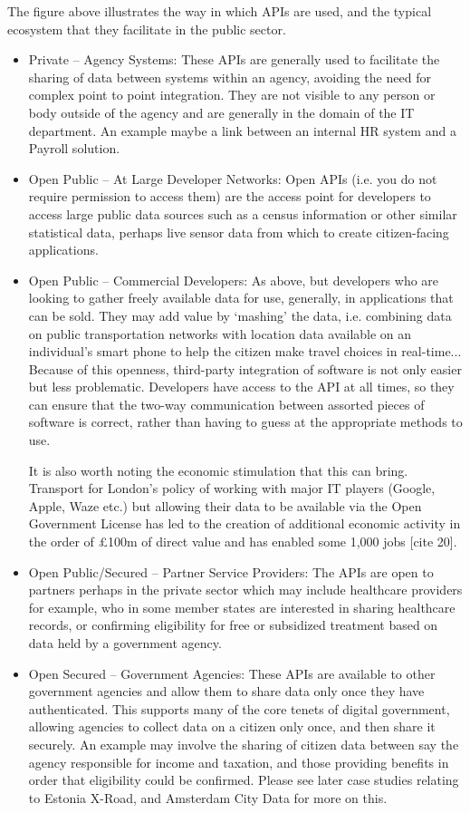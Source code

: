 The figure above illustrates the way in which APIs are used, and the typical
ecosystem that they facilitate in the public sector.
\begin{itemize}
	\item Private – Agency Systems: These APIs are generally used to facilitate
	 the sharing of data between systems within an agency, avoiding the need
	 for complex point to point integration. They are not visible to any person
	 or body outside of the agency and are generally in the domain of the IT
	 department. An example maybe a link between an internal HR system and a
	 Payroll solution.
	 \item Open Public – At Large Developer Networks: Open APIs (i.e. you do
	 not require permission to access them) are the access point for developers
	 to access large public data sources such as a census information or other
	 similar statistical data, perhaps live sensor data from which to create
	 citizen-facing applications.
	 \item Open Public – Commercial Developers: As above, but developers who are
	 looking to gather freely available data for use, generally, in applications
	 that can be sold. They may add value by ‘mashing’ the data, i.e. combining
	 data on public transportation networks with location data available on an
	 individual’s smart phone to help the citizen make travel choices in real-time...
	 Because of this openness, third-party integration of software is not only easier
	 but less problematic. Developers have access to the API at all times, so they
	 can ensure that the two-way communication between assorted pieces of software
	 is correct, rather than having to guess at the appropriate methods to use.
	 
	 It is also worth noting the economic stimulation that this can bring. Transport
	 for London’s policy of working with major IT players (Google, Apple, Waze etc.)
	 but allowing their data to be available via the Open Government License has led
	 to the creation of additional economic activity in the order of £100m of direct
	 value and has enabled some 1,000 jobs [cite 20].
	 \item Open Public/Secured – Partner Service Providers: The APIs are open to
	 partners perhaps in the private sector which may include healthcare providers
	 for example, who in some member states are interested in sharing healthcare
	 records, or confirming eligibility for free or subsidized treatment based on
	 data held by a government agency.
	 \item Open Secured – Government Agencies: These APIs are available to other
	 government agencies and allow them to share data only once they have
	 authenticated. This supports many of the core tenets of digital government,
	 allowing agencies to collect data on a citizen only once, and then share it
	 securely. An example may involve the sharing of citizen data between say the
	 agency responsible for income and taxation, and those providing benefits in
	 order that eligibility could be confirmed. Please see later case studies
	 relating to Estonia X-Road, and Amsterdam City Data for more on this.
	 

\end{itemize}
